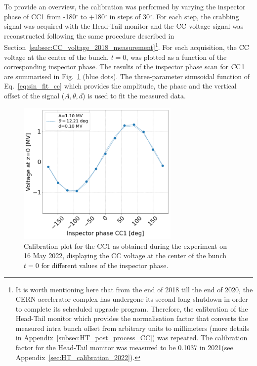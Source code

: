 To provide an overview, the calibration was performed by varying the inspector phase of CC1 from -180$^\circ$ to +180$^\circ$ in steps of 30$^\circ$. For each step, the crabbing signal was acquired with the Head-Tail monitor and the ${\mathrm{CC}}$ voltage signal was reconstructed following the same procedure described in Section~\ref{subsec:CC_voltage_2018_measurement}\footnote{It is worth mentioning here that from the end of 2018 till the end of 2020, the CERN accelerator complex has undergone its second long shutdown in order to complete its scheduled upgrade program. Therefore, the calibration of the Head-Tail monitor which provides the normalisation factor that converts the measured intra bunch offset from arbitrary units to millimeters (more details in Appendix~\ref{subsec:HT_post_process_CC}) was repeated. The calibration factor for the Head-Tail monitor was measured to be 0.1037 in 2021(see Appendix~\ref{sec:HT_calibration_2022}).}. For each acquisition, the ${\mathrm{CC}}$ voltage at the center of the bunch, $t=0$, was plotted as a function of the corresponding inspector phase. The results of the inspector phase scan for ${\mathrm{CC}}$1 are summarised in Fig.~\ref{fig:Vcc_calibration_md_2022} (blue dots). 
The three-parameter sinusoidal function of Eq.~\eqref{eq:sin_fit_cc} which provides the amplitude, the phase and the vertical offset of the signal ($A, \theta, d$) is used to fit the measured data.



\begin{figure}[!h] %
   \centering         
   \includegraphics[width=0.7\textwidth]{images/Ch8/Vcc_at_z_zero_vs_inspector_phase_CC1_for_thesis.png}
       \caption{Calibration plot for the CC1 as obtained during the experiment on 16 May 2022, displaying the CC voltage at the center of the bunch $t=0$ for different values of the inspector phase.}
       \label{fig:Vcc_calibration_md_2022}
\end{figure}

